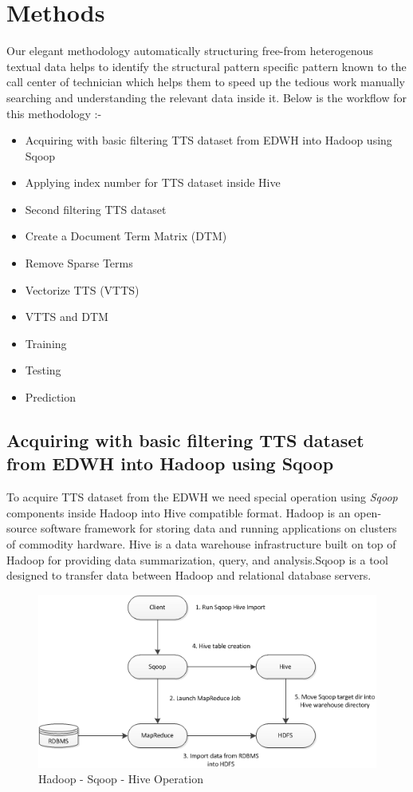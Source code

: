 \documentclass[]{article}
\begin{document}
\section{Methods}\label{methods}

Our elegant methodology automatically structuring free-from heterogenous
textual data helps to identify the structural pattern specific pattern
known to the call center of technician which helps them to speed up the
tedious work manually searching and understanding the relevant data
inside it. Below is the workflow for this methodology :-

\begin{itemize}
\itemsep1pt\parskip0pt
\item
  Acquiring with basic filtering TTS dataset from EDWH into Hadoop using
  Sqoop
\item
  Applying index number for TTS dataset inside Hive
\item
  Second filtering TTS dataset
\item
  Create a Document Term Matrix (DTM)
\item
  Remove Sparse Terms
\item
  Vectorize TTS (VTTS)
\item
  VTTS and DTM
\item
  Training
\item
  Testing
\item
  Prediction
\end{itemize}

\subsection{Acquiring with basic filtering TTS dataset from EDWH into
Hadoop using
Sqoop}\label{acquiring-with-basic-filtering-tts-dataset-from-edwh-into-hadoop-using-sqoop}

To acquire TTS dataset from the EDWH we need special operation using
\emph{Sqoop} components inside Hadoop into Hive compatible format.
Hadoop is an open-source software framework for storing data and running
applications on clusters of commodity hardware. Hive is a data warehouse
infrastructure built on top of Hadoop for providing data summarization,
query, and analysis.Sqoop is a tool designed to transfer data between
Hadoop and relational database servers.

\begin{figure}[htbp]
\centering
\includegraphics{hivesqoophadoop.png}
\caption{Hadoop - Sqoop - Hive Operation}
\end{figure}
\end{document}
